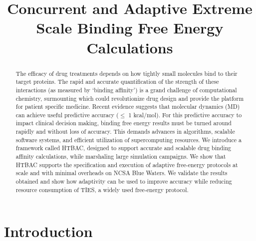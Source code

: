 \documentclass[conference]{IEEEtran}
\begin{document}
\title{Concurrent and Adaptive Extreme Scale Binding Free Energy
Calculations}

\author{
}

\maketitle

\begin{abstract}
The efficacy of drug treatments depends on how tightly small molecules bind
to their target proteins. The rapid and accurate quantification of the
strength of these interactions (as measured by `binding affinity’) is a grand
challenge of computational chemistry, surmounting which could revolutionize
drug design and provide the platform for patient specific medicine. Recent
evidence suggests that molecular dynamics (MD) can achieve useful predictive
accuracy ($\leq$ 1 kcal/mol). For this predictive accuracy to impact clinical
decision making, binding free energy results must be turned around rapidly
and without loss of accuracy. This demands advances in algorithms, scalable
software systems, and efficient utilization of supercomputing resources. We
introduce a framework called HTBAC, designed to support accurate
and scalable drug binding affinity calculations, while marshaling large
simulation campaigns. We show that HTBAC supports the specification and
execution of adaptive free-energy protocols at scale and with minimal
overheads on NCSA Blue Waters. We validate the results obtained and show how
adaptivity can be used to improve accuracy while reducing resource
consumption of TIES, a widely used free-energy protocol.
\end{abstract}


\section{Introduction}\label{sec:intro}

\end{document}
